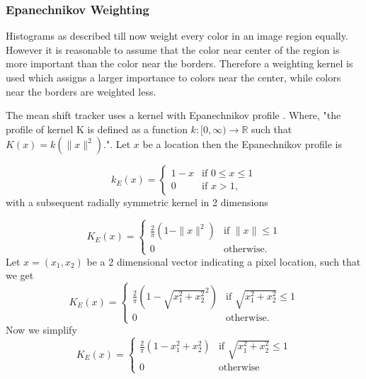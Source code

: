 \documentclass[a4paper,11pt]{article}
\begin{document}
\subsubsection{Epanechnikov Weighting}
Histograms as described till now weight every color in an image region equally. However it is reasonable to assume that the color near center of the region is more important than the color near the borders. Therefore a weighting kernel is used which assigns a larger importance to colors near the center, while colors near the borders are weighted less. 

The mean shift tracker uses a kernel with Epanechnikov profile \cite{mean_shift_epan}. Where, "the profile of kernel K is defined as a function $k:[0,\infty)\rightarrow\mathds{R}$ such that $K(x)=k(\|x\|^2)$."\cite{mean_shift}.
Let $x$ be a location then the Epanechnikov profile is

\begin{equation}
\label{eq:epanechnikov_profile}
k_E(x) = \left\{ \begin{array}{cl}
  1-x & \textrm{if } 0 \leq x \leq 1\\
  0 & \textrm{if }  x > 1 ,\end{array}\right.
\end{equation}
with a subsequent radially symmetric kernel in 2 dimensions

\begin{equation}
\label{eq:epanechnikov_kernel1}
K_E(x) = \left\{ \begin{array}{cl}
  \frac{2}{\pi} (1-\|x\|^2) & \textrm{if } \|x\| \leq 1 \\
  0 & \textrm{otherwise.} \end{array}\right.
\end{equation}
Let $x = (x_1,x_2)$ be a 2 dimensional vector indicating a pixel location, such that we get
\begin{equation}
\label{eq:epanechnikov_kernel2}
K_E(x) = \left\{ \begin{array}{cl}
  \frac{2}{\pi} (1-\sqrt{x_1^2 + x_2^2}^2) & \textrm{if } \sqrt{x_1^2 + x_2^2} \leq 1 \\
  0 & \textrm{otherwise.} \end{array}\right.
\end{equation}
Now we simplify
\begin{equation}
\label{eq:epanechnikov_kernel2}
K_E(x) = \left\{ \begin{array}{cl}
  \frac{2}{\pi} (1-x_1^2 + x_2^2) & \textrm{if } \sqrt{x_1^2 + x_2^2} \leq 1 \\
  0 & \textrm{otherwise} \end{array}\right.
\end{equation}
\end{document}
